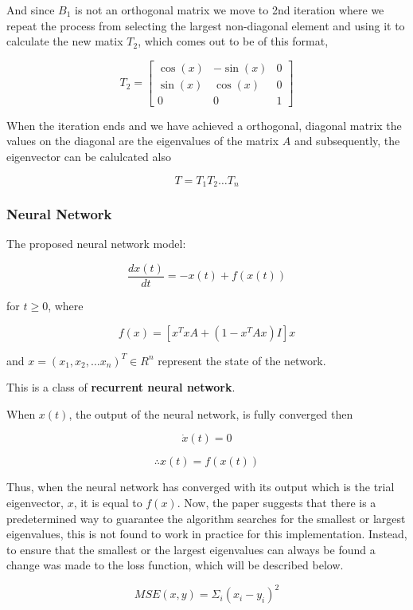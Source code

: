 \documentclass{article}
\begin{document}
And since $B_{1}$ is not an orthogonal matrix we move to 2nd iteration where we repeat the process from selecting the largest non-diagonal element and using it to calculate the new matix $T_{2}$, which comes out to be of this format,

\[
    T_{2} = 
    \begin{bmatrix}
        \cos(x) & -\sin(x) & 0 \\
        \sin(x) & \cos(x) & 0 \\
        0 & 0 & 1 
          
    \end{bmatrix}
\]

When the iteration ends and we have achieved a orthogonal, diagonal matrix the values on the diagonal are the eigenvalues of the matrix $A$ and subsequently, the eigenvector can be calulcated also

\[
    T = T_{1} T_{2} \dots T_{n}
\]

\subsubsection{Neural Network}

The proposed neural network model:

\[ \frac{dx(t)}{dt} = -x(t) + f(x(t)) \]

for $t \ge 0$, where

\[f(x) = [x^T{x}{A} + (1 - x^T{A}{x})I]x \]

and $ x = (x_1, x_2, \ldots x_n)^{T} \in R^{n}$ represent the state of the network.

This is a class of \large \textbf{recurrent neural network}.

\normalsize 
When $x(t)$, the output of the neural network, is fully converged then

\[
    \dot x(t) = 0
\]

\[
    \therefore x(t) = f(x(t))
\]

Thus, when the neural network has converged with its output which is the trial eigenvector, $x$, it is equal to $f(x)$. Now, the paper suggests that there is a predetermined way to guarantee the algorithm searches for the smallest or largest eigenvalues, this is not found to work in practice for this implementation. Instead, to ensure that the smallest or the largest eigenvalues can always be found a change was made to the loss function, which will be described below.

\[
    MSE(x,y) = \Sigma_{i} (x_{i} - y_{i})^{2}
\]
\end{document}
